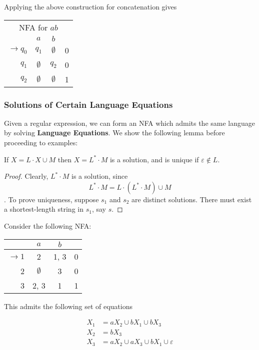 Applying the above construction for concatenation gives
\begin{center}
\begin{tabular}{r| c c r}
      \multicolumn{4}{c}{NFA for \(ab\)}\\
      & \(a\) & \(b\) & \\\bottomrule
      \(\to q_0\) & \(q_1\) & \(\emptyset\) & 0\\
          \(q_1\) & \(\emptyset\) & \(q_2\) & 0\\
          \(q_2\) & \(\emptyset\) & \(\emptyset\) & 1
 \end{tabular}
\end{center}

\subsubsection{Solutions of Certain Language Equations}

Given a regular expression, we can form an NFA which admits the same language by solving \textbf{Language Equations}. We show the following lemma before proceeding to examples:

\begin{lemma}
      If \(X=L\cdot X\cup M\) then \(X=L^*\cdot M\) is a solution, and is unique if \(\varepsilon\not\in L\). 
\end{lemma}

\begin{proof}
      Clearly, \(L^*\cdot M\) is a solution, since \[L^*\cdot M = L\cdot (L^*\cdot M)\cup M\]. To prove uniqueness, suppose \(s_1\) and \(s_2\) are distinct solutions. There must exist a shortest-length string in \(s_1\), say \(s\). 
\end{proof}

Consider the following NFA:

\begin{center}\begin{tabular}{r| c c r}
      & \(a\) & \(b\) & \\\bottomrule
      \(\to 1\) & 2 & 1, 3 & 0\\
            2 & \(\emptyset\) & 3 & 0\\
            3 & 2, 3 & 1 & 1
 \end{tabular}\end{center}

This admits the following set of equations 

\begin{align}
      X_1 &= aX_2\cup bX_1\cup bX_3\\
      X_2 &= bX_3\\
      X_3 &= aX_2\cup aX_3\cup bX_1\cup\varepsilon
\end{align}

